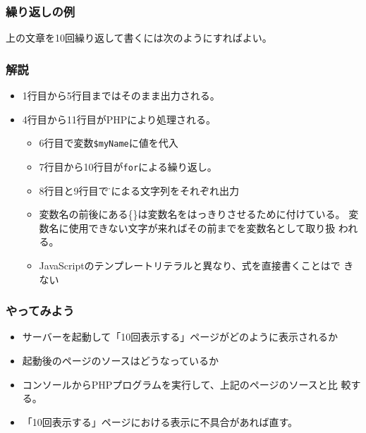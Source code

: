 \begin{frame}[containsverbatim]
 \frametitle{繰り返しの例}
 上の文章を10回繰り返して書くには次のようにすればよい。
\end{frame}
\begin{frame}[containsverbatim]
 \frametitle{解説}
 \begin{itemize}
  \item 1行目から5行目まではそのまま出力される。
  \item 4行目から11行目がPHPにより処理される。
   \begin{itemize}
    \item 6行目で変数\Verb+$myName+に値を代入
    \item 7行目から10行目が\texttt{for}による繰り返し。
    \item 8行目と9行目で\"と\' による文字列をそれぞれ出力
    \item 変数名の前後にある\{\}は変数名をはっきりさせるために付けている。
          変数名に使用できない文字が来ればその前までを変数名として取り扱
          われる。
    \item JavaScriptのテンプレートリテラルと異なり、式を直接書くことはで
          きない
   \end{itemize}
 \end{itemize}
\end{frame}
\begin{frame}[containsverbatim]
 \frametitle{やってみよう}
 \begin{itemize}
  \item サーバーを起動して「10回表示する」ページがどのように表示されるか
  \item 起動後のページのソースはどうなっているか
  \item コンソールからPHPプログラムを実行して、上記のページのソースと比
        較する。
  \item 「10回表示する」ページにおける表示に不具合があれば直す。
 \end{itemize}
\end{frame}
 
\begin{frame}[containsverbatim]
\frametitle{}
\end{frame}
